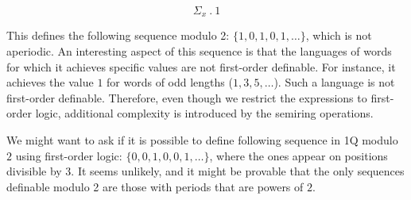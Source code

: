 \documentclass[12pt]{article}
\theoremstyle{definition}
\begin{document}
$$ \Sigma_x \ . \ 1 $$

This defines the following sequence modulo 2: $\{1, 0, 1, 0, 1, \ldots\}$, which is not aperiodic. An interesting aspect of this sequence is that the languages of words for which it achieves specific values are not first-order definable. For instance, it achieves the value $1$ for words of odd lengths ($1, 3, 5, \ldots$). Such a language is not first-order definable. Therefore, even though we restrict the expressions to first-order logic, additional complexity is introduced by the semiring operations.

We might want to ask if it is possible to define following sequence in 1Q modulo $2$ using first-order logic: $\{0, 0, 1, 0, 0, 1, \ldots\}$, where the ones appear on positions divisible by 3. It seems unlikely, and it might be provable that the only sequences definable modulo 2 are those with periods that are powers of $2$.



\end{document}
